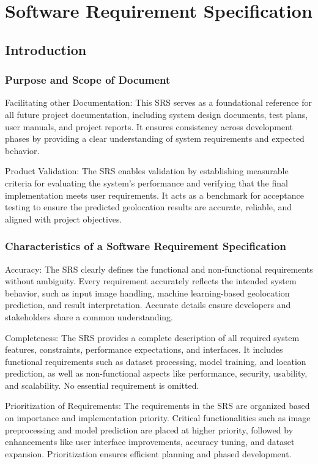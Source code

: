 \chapter{Software Requirement Specification}

\section{Introduction}
\subsection{Purpose and Scope of Document}
Facilitating other Documentation: This SRS serves as a foundational reference for all future project documentation, including system design documents, test plans, user manuals, and project reports. It ensures consistency across development phases by providing a clear understanding of system requirements and expected behavior.

Product Validation: The SRS enables validation by establishing measurable criteria for evaluating the system's performance and verifying that the final implementation meets user requirements. It acts as a benchmark for acceptance testing to ensure the predicted geolocation results are accurate, reliable, and aligned with project objectives.

\subsection{Characteristics of a Software Requirement Specification}
Accuracy: The SRS clearly defines the functional and non-functional requirements without ambiguity. Every requirement accurately reflects the intended system behavior, such as input image handling, machine learning-based geolocation prediction, and result interpretation. Accurate details ensure developers and stakeholders share a common understanding.

Completeness: The SRS provides a complete description of all required system features, constraints, performance expectations, and interfaces. It includes functional requirements such as dataset processing, model training, and location prediction, as well as non-functional aspects like performance, security, usability, and scalability. No essential requirement is omitted.

Prioritization of Requirements: The requirements in the SRS are organized based on importance and implementation priority. Critical functionalities such as image preprocessing and model prediction are placed at higher priority, followed by enhancements like user interface improvements, accuracy tuning, and dataset expansion. Prioritization ensures efficient planning and phased development.


